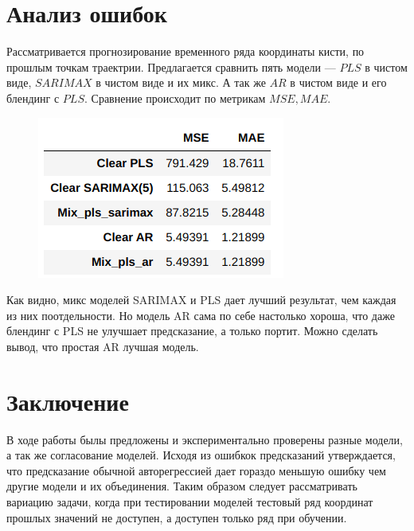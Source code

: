 \documentclass{article}
\begin{document}
\section{Анализ ошибок}
Рассматривается прогнозирование временного ряда координаты кисти, по прошлым точкам траектрии. Предлагается сравнить пять модели --- $PLS$ в чистом виде, $SARIMAX$ в чистом виде и их микс. А так же $AR$ в чистом виде и его блендинг с $PLS$. Сравнение происходит по метрикам $MSE, MAE$.
\begin{figure}[H]
\includegraphics[scale=1]{images/7.png}
\end{figure}
Как видно, микс моделей SARIMAX и PLS дает лучший результат, чем каждая из них поотдельности. Но модель AR сама по себе настолько хороша, что даже блендинг с PLS не улучшает предсказание, а только портит. Можно сделать вывод, что простая AR лучшая модель.
\section{Заключение}
В ходе работы былы предложены и экспериментально проверены разные модели, а так же согласование моделей. Исходя из ошибкок предсказаний утверждается, что предсказание обычной авторегрессией дает гораздо меньшую ошибку чем другие модели и их объединения. Таким образом следует рассматривать вариацию задачи, когда при тестировании моделей тестовый ряд координат прошлых значений не доступен, а доступен только ряд при обучении. 


\nocite{*}


\end{document}
